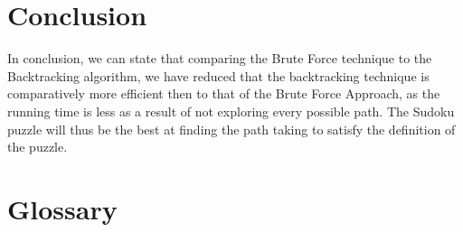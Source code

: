 \documentclass[12pt]{article}
\begin{document}
\section{Conclusion}
\begin{flushleft}
In conclusion, we can state that comparing the Brute Force technique to the Backtracking algorithm, we have reduced that the backtracking technique is comparatively more efficient then to that of the Brute Force Approach, as the running time is less as a result of not exploring every possible path. The Sudoku puzzle will thus be the best at finding the path taking to satisfy the definition of the puzzle. 
\end{flushleft}
\section{Glossary}
\end{document}
